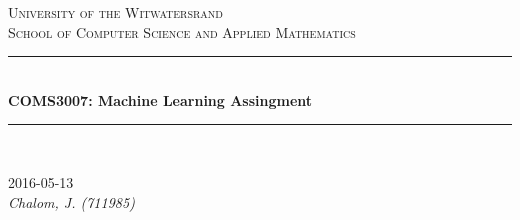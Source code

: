 \documentclass[11pt]{article}
\begin{document}
\begin{titlepage}

\newcommand{\HRule}{\rule{\linewidth}{0.3mm}} %
\renewcommand\section{\@startsection{section}{1}{\z@}%
                                  {-3.5ex \@plus -1ex \@minus -.2ex}%
                                  {2.3ex \@plus.2ex}%
                                  {\normalfont\large\bfseries}}

\center %
 

\textsc{\LARGE University of the Witwatersrand}\\[1.5cm] %
\textsc{\Large School of Computer Science and Applied Mathematics}\\[0.5cm] %


\HRule \\[0.4cm]
{ \huge \bfseries COMS3007: Machine Learning Assingment}\\[0.4cm] %
\HRule \\[1.5cm]
 
\begin{minipage}{1\textwidth}
\Large 2016-05-13\\
\Large \emph{Chalom, J. (711985)}\\

\end{minipage}


\vfill %

\end{titlepage}
\end{document}
